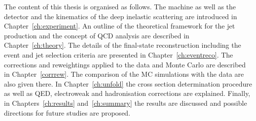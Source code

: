 The content of this thesis is organised as follows. The \hera machine as well as the \zeus detector and the kinematics of the deep inelastic scattering are introduced in Chapter~\ref{ch:experiment}. An outline of the theoretical framework for the jet production and the concept of QCD analysis are described in Chapter~\ref{ch:theory}. The details of the final-state reconstruction including the event and jet selection criteria are presented in Chapter~\ref{ch:eventreco}. The corrections and reweightings applied to the data and Monte Carlo are described in Chapter~\ref{corrrew}. The comparison of the MC simulations with the data are also given there. In Chapter~\ref{ch:unfold} the cross section determination procedure as well as QED, electroweak and hadronisation corrections are explained. Finally, in Chapters~\ref{ch:results} and~\ref{ch:summary} the results are discussed and possible directions for future studies are proposed.